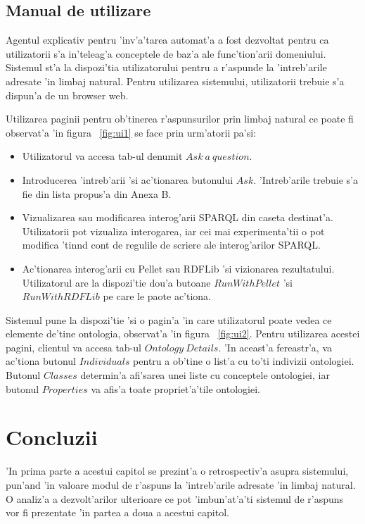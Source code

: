 \documentclass[12pt,a4paper,twoside]{report}
\begin{document}
\section{Manual de utilizare}

Agentul explicativ pentru 'inv'a'tarea automat'a a fost dezvoltat pentru ca utilizatorii s'a in'teleag'a conceptele de baz'a ale func'tion'arii domeniului. Sistemul st'a la dispozi'tia utilizatorului pentru a r'aspunde la 'intreb'arile adresate 'in limbaj natural. Pentru utilizarea sistemului, utilizatorii trebuie s'a dispun'a de un browser web. 

Utilizarea paginii pentru ob'tinerea r'aspunsurilor prin limbaj natural ce poate fi observat'a 'in figura ~\ref{fig:ui1} se face prin urm'atorii pa'si:
\begin{itemize}
    \item Utilizatorul va accesa tab-ul denumit $Ask\ a\ question$.
    \item Introducerea 'intreb'arii 'si ac'tionarea butonului $Ask$. 'Intreb'arile trebuie s'a fie din lista propus'a din Anexa B. 
    \item Vizualizarea sau modificarea interog'arii SPARQL din caseta destinat'a. Utilizatorii pot vizualiza interogarea, iar cei mai experimenta'tii o pot modifica 'tin\ia nd cont de regulile de scriere ale interog'arilor SPARQL.
    \item Ac'tionarea interog'arii cu Pellet sau RDFLib 'si vizionarea rezultatului. Utilizatorul are la dispozi'tie dou'a butoane $RunWithPellet$ 'si $RunWithRDFLib$ pe care le paote ac'tiona.
\end{itemize}

Sistemul pune la dispozi'tie 'si o pagin'a 'in care utilizatorul poate vedea ce elemente de'tine ontologia, observat'a 'in figura ~\ref{fig:ui2}. Pentru utilizarea acestei pagini, clientul va accesa tab-ul $Ontology\ Details$. 'In aceast'a fereastr'a, va ac'tiona butonul $Individuals$ pentru a ob'tine o list'a cu to'ti indivizii ontologiei. Butonul $Classes$ determin'a afi'sarea unei liste cu conceptele ontologiei, iar butonul $Properties$ va afis'a toate propriet'a'tile ontologiei.

\chapter{Concluzii}
\label{sec:concluzii}

'In prima parte a acestui capitol se prezint'a o retrospectiv'a asupra sistemului, pun'and 'in valoare modul de r'aspuns la 'intreb'arile adresate 'in limbaj natural. O analiz'a a dezvolt'arilor ulterioare ce pot 'imbun'at'a'ti sistemul de r'aspuns vor fi prezentate 'in partea a doua a acestui capitol.
\end{document}
